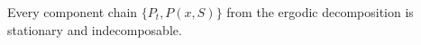 Every component chain $\{P_t,P(x,S)\}$ from the ergodic decomposition is stationary and indecomposable.
